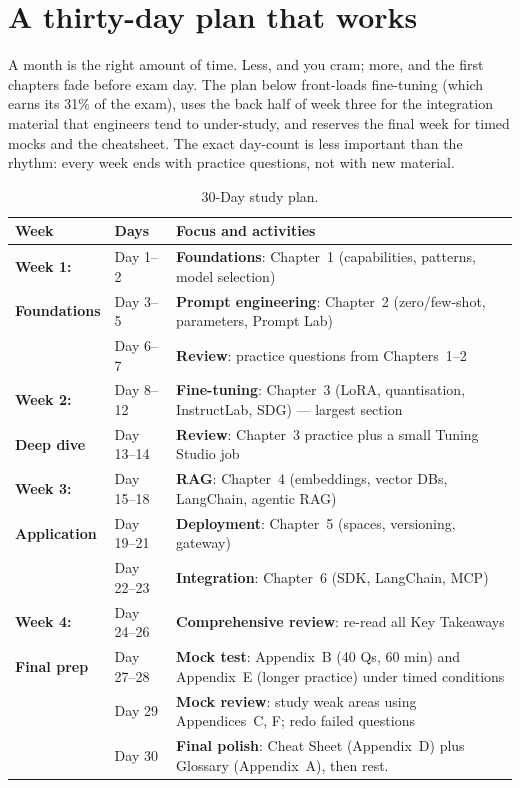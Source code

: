 
\section*{A thirty-day plan that works}

A month is the right amount of time. Less, and you cram; more, and the first chapters fade before exam day. The plan below front-loads fine-tuning (which earns its 31\% of the exam), uses the back half of week three for the integration material that engineers tend to under-study, and reserves the final week for timed mocks and the cheatsheet. The exact day-count is less important than the rhythm: every week ends with practice questions, not with new material.

\begin{table}[h]
\small
\centering
\begin{tabularx}{\textwidth}{l l X}
\toprule
\textbf{Week} & \textbf{Days} & \textbf{Focus and activities} \\
\midrule
\textbf{Week 1:} & Day 1--2 & \textbf{Foundations}: Chapter~1 (capabilities, patterns, model selection) \\
\textbf{Foundations} & Day 3--5 & \textbf{Prompt engineering}: Chapter~2 (zero/few-shot, parameters, Prompt Lab) \\
& Day 6--7 & \textbf{Review}: practice questions from Chapters~1--2 \\
\midrule
\textbf{Week 2:} & Day 8--12 & \textbf{Fine-tuning}: Chapter~3 (LoRA, quantisation, InstructLab, SDG) --- largest section \\
\textbf{Deep dive} & Day 13--14 & \textbf{Review}: Chapter~3 practice plus a small Tuning Studio job \\
\midrule
\textbf{Week 3:} & Day 15--18 & \textbf{RAG}: Chapter~4 (embeddings, vector DBs, LangChain, agentic RAG) \\
\textbf{Application} & Day 19--21 & \textbf{Deployment}: Chapter~5 (spaces, versioning, gateway) \\
& Day 22--23 & \textbf{Integration}: Chapter~6 (SDK, LangChain, MCP) \\
\midrule
\textbf{Week 4:} & Day 24--26 & \textbf{Comprehensive review}: re-read all Key Takeaways \\
\textbf{Final prep} & Day 27--28 & \textbf{Mock test}: Appendix~B (40 Qs, 60 min) and Appendix~E (longer practice) under timed conditions \\
& Day 29 & \textbf{Mock review}: study weak areas using Appendices~C, F; redo failed questions \\
& Day 30 & \textbf{Final polish}: Cheat Sheet (Appendix~D) plus Glossary (Appendix~A), then rest. \\
\bottomrule
\end{tabularx}
\caption{30-Day study plan.}
\label{tab:study-plan}
\end{table}

